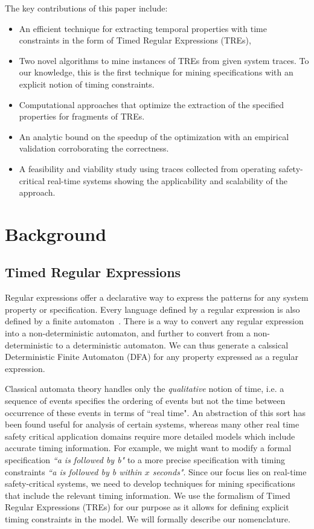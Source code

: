 \documentclass[]{sigplanconf}
\begin{document}
\noindent The key contributions of this paper include:

\begin{itemize}
\item An efficient technique for extracting temporal properties with time constraints in the form of Timed Regular Expressions (TREs),
\item Two novel algorithms to mine instances of TREs from given system traces. To our knowledge, this is the first technique for mining specifications with an explicit notion of timing constraints.
\item Computational approaches that optimize the extraction of the specified properties for fragments of TREs.
\item An analytic bound on the speedup of the optimization with an empirical validation corroborating the correctness.
\item A feasibility and viability study using traces collected from operating safety-critical real-time systems showing the applicability and scalability of the approach.
\end{itemize}

\section{Background} \label{Background}

\subsection{Timed Regular Expressions}

Regular expressions offer a declarative way to express the patterns for any system property or specification. Every language defined by a regular expression is also defined by a finite automaton~\cite{book1}. There is a way to convert any regular expression into a non-deterministic automaton, and further to convert from a non-deterministic to a deterministic automaton. We can thus generate a calssical Deterministic Finite Automaton (DFA) for any property expressed as a regular expression.


Classical automata theory handles only the \emph{qualitative} notion of time, i.e. a sequence of events specifies the ordering of events but not the time between occurrence of these events in terms of ``real time". An abstraction of this sort has been found useful for analysis of certain systems, whereas many other real time safety critical application domains require more detailed models which include accurate timing information. For example, we might want to modify a formal specification \emph{``a is followed by b"} to a more precise specification with timing constraints \emph{``a is followed by b within $x$ seconds"}. Since our focus lies on real-time safety-critical systems, we need to develop techniques for mining specifications that include the relevant timing information. We use the formalism of Timed Regular Expressions (TREs) for our purpose as it allows for defining explicit timing constraints in the model. We will formally describe our nomenclature.
\end{document}
